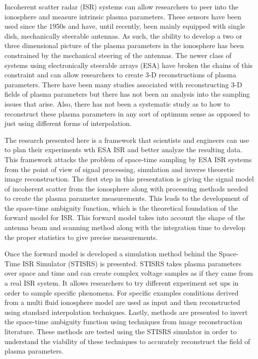 
Incoherent scatter radar (ISR) systems can allow researchers to peer into the ionosphere and measure intrinsic plasma parameters. These sensors have been used since the 1950s and have, until recently, been mainly equipped with single dish, mechanically steerable antennas. As such, the ability to develop a two or three dimensional picture of the plasma parameters in the ionosphere has been constrained by the mechanical steering of the antennas. The newer class of systems using electronically steerable arrays (ESA) have broken the chains of this constraint and can allow researchers to create 3-D reconstructions of plasma parameters. There have been many studies associated with reconstructing 3-D fields of plasma parameters but there has not been an analysis into the sampling issues that arise. Also, there has not been a systematic study as to how to reconstruct these plasma parameters in any sort of optimum sense as opposed to just using different forms of interpolation.

The research presented here is a framework that scientists and engineers can use to plan their experiments wth ESA ISR and better analyze the resulting data. This framework attacks the problem of space-time sampling by ESA ISR systems from the point of view of signal processing, simulation and inverse theoretic image reconstruction. The first step in this presentation is giving the signal model of incoherent scatter from the ionosphere along with processing methods needed to create the plasma parameter measurements. This leads to the development of the space-time ambiguity function, which is the theoretical foundation of the forward model for ISR. This forward model takes into account the shape of the antenna beam and scanning method along with the integration time to develop the proper statistics to give precise measurements.

Once the forward model is developed a simulation method behind the Space-Time ISR Simulator (STISRS) is presented. STISRS takes plasma parameters over space and time and can create complex voltage samples as if they came from a real ISR system. It allows researchers to try different experiment set ups in order to sample specific phenomena. For specific examples conditions derived from a multi fluid ionosphere model are used as input and then reconstructed using standard interpolation techniques. Lastly, methods are presented to invert the space-time ambiguity function using techniques from image reconstruction literature. These methods are tested using the STISRS simulator in order to understand the viability of these techniques to accurately reconstruct the field of plasma parameters.
